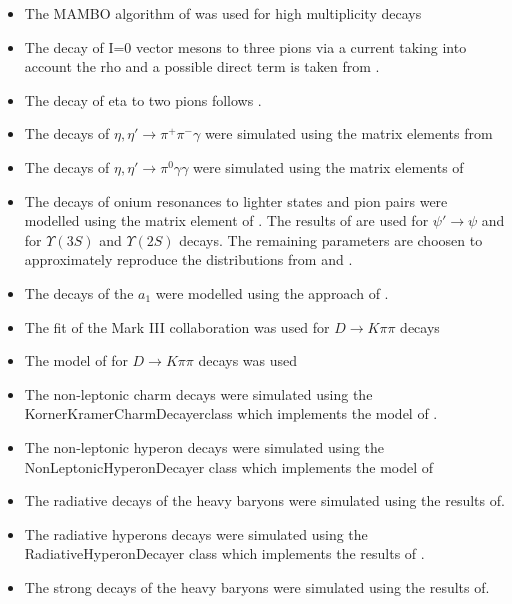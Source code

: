 \documentclass{article}
\begin{document}
\begin{itemize}
\item The MAMBO algorithm of \cite{Kleiss:1991rn} was used for high multiplicity decays
\item The decay of I=0 vector mesons to three pions via a current taking into account the rho and a possible direct term is taken from \cite{Aloisio:2003ur}.
\item The decay of eta to two pions follows \cite{Beisert:2003zs,Gormley:1970qz,Tippens:2001fm}.
\item The decays of $\eta,\eta'\to\pi^+\pi^-\gamma$ were simulated using the matrix elements from \cite{Venugopal:1998fq,Holstein:2001bt}
\item The decays of $\eta,\eta'\to\pi^0\gamma\gamma$ were simulated using the matrix elements of \cite{Holstein:2001bt}
\item The decays of onium resonances to lighter states and pion pairs were modelled using the matrix element of \cite{Brown:1975dz}. The results of \cite{Bai:1999mj} are used for $\psi'\to\psi$ and \cite{Cronin-Hennessy:2007sj} for $\Upsilon(3S)$ and $\Upsilon(2S)$ decays. The remaining parameters are choosen to approximately reproduce the distributions from \cite{Aubert:2006bm} and \cite{Adam:2005mr}.
\item The decays of the $a_1$ were modelled using the approach of \cite{Kuhn:1990ad}.

\item The fit of the Mark III collaboration \cite{Adler:1987sd} was used for $D\to K\pi\pi$ decays
\item The model of \cite{Anjos:1992kb} for $D\to K\pi\pi$ decays was used
\item The non-leptonic charm decays were simulated using the KornerKramerCharmDecayerclass which implements the model of \cite{Korner:1992wi}.
\item The non-leptonic hyperon decays were simulated using the NonLeptonicHyperonDecayer class which implements the model of\cite{Borasoy:1999md}
\item The radiative decays of the heavy baryons were simulated using the results of\cite{Ivanov:1999bk,Ivanov:1998wj}.
\item The radiative hyperons decays were simulated using the RadiativeHyperonDecayer class which implements the results of \cite{Borasoy:1999nt}.
\item The strong decays of the heavy baryons were simulated using the results of\cite{Ivanov:1999bk}.
\end{itemize}
\end{document}
